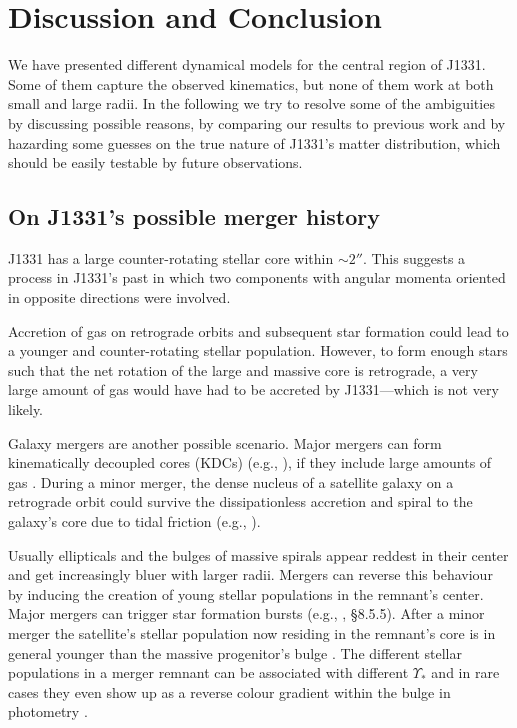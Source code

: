 \documentclass[useAMS,usenatbib]{mnras}
\begin{document}
\section{Discussion and Conclusion} \label{sec:Discussion}

We have presented different dynamical models for the central region of J1331. Some of them capture the observed kinematics, but none of them work at both small and large radii. In the following we try to resolve some of the ambiguities by discussing possible reasons, by comparing our results to previous work and by hazarding some guesses on the true nature of J1331's matter distribution, which should be easily testable by future observations.

\subsection{On J1331's possible merger history} \label{sec:discussion_merger}

J1331 has a large counter-rotating stellar core within $\sim 2''$. This suggests a process in J1331's past in which two components with angular momenta oriented in opposite directions were involved.

Accretion of gas on retrograde orbits and subsequent star formation could lead to a younger and counter-rotating stellar population. However, to form enough stars such that the net rotation of the large and massive core is retrograde, a very large amount of gas would have had to be accreted by J1331---which is not very likely. 

Galaxy mergers are another possible scenario. Major mergers can form kinematically decoupled cores (KDCs) (e.g., \citealt{2011MNRAS.414.2923K,2015ApJ...802L...3T}), if they include large amounts of gas \citep{2010ApJ...723..818H}. During a minor merger, the dense nucleus of a satellite galaxy on a retrograde orbit could survive the dissipationless accretion and spiral to the galaxy's core due to tidal friction (e.g., \citealt{1984ApJ...287..577K,1988ApJ...327L..55F}). 

Usually ellipticals and the bulges of massive spirals appear reddest in their center and get increasingly bluer with larger radii. Mergers can reverse this behaviour by inducing the creation of young stellar populations in the remnant's center. Major mergers can trigger star formation bursts (e.g., \citealt{2008gady.book.....B}, \S 8.5.5). After a minor merger the satellite's stellar population now residing in the remnant's core is in general younger than the massive progenitor's bulge \citep{1996AJ....112..839C,2010MNRAS.404.1775T}. The different stellar populations in a merger remnant can be associated with different $\Upsilon_*$ and in rare cases they even show up as a reverse colour gradient within the bulge in photometry \citep{1990ApJ...361..381B, 1997ApJ...481..710C}.
\end{document}
